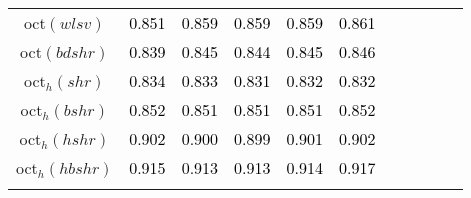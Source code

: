 \begin{tabular}[t]{c|>{}cccc>{}c|ccccc}
oct$(wlsv)$ & \textcolor{black}{0.851} & \textcolor{black}{0.859} & \textcolor{black}{0.859} & \textcolor{black}{0.859} & \textcolor{black}{0.861} &  &  &  &  & \\
oct$(bdshr)$ & \textcolor{black}{0.839} & \textcolor{black}{0.845} & \textcolor{black}{0.844} & \textcolor{black}{0.845} & \textcolor{black}{0.846} &  &  &  &  & \\
oct$_h(shr)$ & \textcolor{black}{0.834} & \textcolor{black}{0.833} & \textcolor{black}{0.831} & \textcolor{black}{0.832} & \textcolor{black}{0.832} &  &  &  &  & \\
oct$_h(bshr)$ & \textcolor{black}{0.852} & \textcolor{black}{0.851} & \textcolor{black}{0.851} & \textcolor{black}{0.851} & \textcolor{black}{0.852} &  &  &  &  & \\
oct$_h(hshr)$ & \textcolor{black}{0.902} & \textcolor{black}{0.900} & \textcolor{black}{0.899} & \textcolor{black}{0.901} & \textcolor{black}{0.902} &  &  &  &  & \\
oct$_h(hbshr)$ & \textcolor{black}{0.915} & \textcolor{black}{0.913} & \textcolor{black}{0.913} & \textcolor{black}{0.914} & \textcolor{black}{0.917} &  &  &  &  & \\
\bottomrule
{}\\
\end{tabular}
